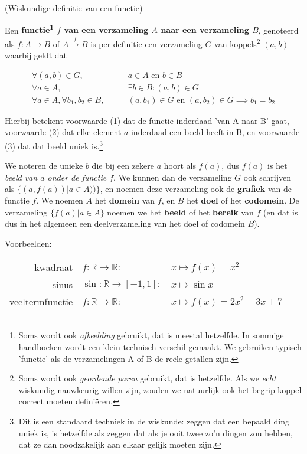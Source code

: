 \documentclass{ximera}
\begin{document}
\begin{definition}  (Wiskundige definitie van een functie)
      
Een \textbf{functie\footnote{Soms wordt ook \textit{afbeelding} gebruikt, dat is meestal hetzelfde. In sommige handboeken wordt een klein technisch verschil gemaakt. We gebruiken typisch 'functie' als de verzamelingen A of B de reële getallen zijn. } $f$  van een verzameling $A$ naar een verzameling $B$}, genoteerd als $f:A\rightarrow B$ of $A \overset{f}{\rightarrow} B$ is per definitie een verzameling $G$  van koppels\footnote{Soms wordt ook \textit{geordende paren} gebruikt, dat is hetzelfde. Als we \textit{echt} wiskundig nauwkeurig willen zijn, zouden we natuurlijk ook het begrip koppel correct moeten definiëren.} $(a,b)$ waarbij geldt dat

\begin{align}
\forall (a,b) \in G, \qquad & a\in A \text{ en } b\in B \\
\forall a \in A, \qquad & \exists  b \in B : (a,b) \in G \\
\forall a\in A, \forall b_1,b_2 \in B, \qquad  & (a,b_1) \in G \text{ en } (a,b_2) \in G \implies b_1 = b_2  
\end{align}

\end{definition}
Hierbij betekent voorwaarde (1) dat de functie inderdaad 'van A naar B' gaat, voorwaarde (2) dat elke element $a$ inderdaad een beeld heeft in B, en voorwaarde (3) dat dat beeld uniek is.\footnote{Dit is een standaard techniek in de wiskunde: zeggen dat een bepaald ding uniek is, is hetzelfde als zeggen dat als je ooit twee zo'n dingen zou hebben, dat ze dan noodzakelijk aan elkaar gelijk moeten zijn. }

We noteren de unieke $b$ die bij een zekere $a$ hoort als $f(a)$, dus $f(a)$ is  het \textit{beeld van $a$ onder de functie $f$}. We kunnen dan de verzameling $G$ ook schrijven als $\{(a,f(a)) | a\in A))\}$, en noemen deze verzameling ook de \textbf{grafiek} van de functie $f$. We noemen $A$ het \textbf{domein} van $f$, en $B$ het \textbf{doel} of het \textbf{codomein}. De verzameling $\{f(a) | a\in A\}$ noemen we het \textbf{beeld} of het \textbf{bereik} van $f$ (en dat is dus in het algemeen een deelverzameling van het doel of codomein $B$).


Voorbeelden:

\begin{tabular}[t]{r l l l}
kwadraat   & $f : \mathbb{R} \rightarrow \mathbb{R} :  $   & $x \mapsto  f(x) = x^2 $\\
sinus & $\sin : \mathbb{R} \rightarrow [-1,1] :    $ & $x \mapsto  \sin x $\\
veeltermfunctie & $f : \mathbb{R} \rightarrow \mathbb{R} :  $   & $x \mapsto  f(x) = 2x^2+3x+7 $\\
\end{tabular}
\end{document}
